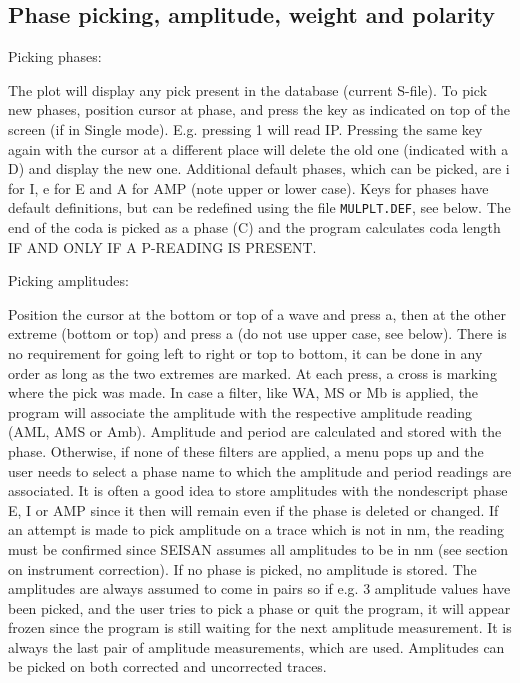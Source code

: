 \subsection{Phase picking, amplitude, weight and polarity}

Picking phases: 

The plot will display any pick present in the database (current S-file). To pick new phases, position cursor at phase, and press the key as indicated on top of the screen (if in Single mode). E.g. pressing 1 will read IP. Pressing the same key again with the cursor at a different place will delete the old one (indicated with a D) and display the new one. Additional default phases, which can be picked, are i for I, e for E and A for AMP (note upper or lower case). Keys for phases have default definitions, but can be redefined using the file \texttt{MULPLT.DEF}, see below. The end of the coda is picked as a phase (C) and the program calculates coda length IF AND ONLY IF A P-READING IS PRESENT. 

Picking amplitudes: 

Position the cursor at the bottom or top of a wave and press a, then at the other extreme (bottom or top) and press a (do not use upper case, see below). There is no requirement for going left to right or top to bottom, it can be done in any order as long as the two extremes are marked. At each press, a cross is marking where the pick was made. In case a filter, like WA, MS or Mb is applied, the program will associate the amplitude with the respective amplitude reading (AML, AMS or Amb).  Amplitude and period are calculated and stored with the phase. Otherwise, if none of these filters are applied, a menu pops up and the user needs to select a phase name to which the amplitude and period readings are associated. It is often a good idea to store amplitudes with the nondescript phase E, I or AMP since it then will remain even if the phase is deleted or changed. If an attempt is made to pick amplitude on a trace which is not in nm, the reading must be confirmed since SEISAN assumes all amplitudes to be in nm (see section on instrument correction). If no phase is picked, no amplitude is stored. The amplitudes are always assumed to come in pairs so if 
e.g. 3 amplitude values have been picked, and the user tries to pick a phase or quit the program, it will appear frozen since the program is still waiting for the next amplitude measurement. It is always the last pair of amplitude measurements, which are used. Amplitudes can be picked on both corrected and uncorrected traces. 

